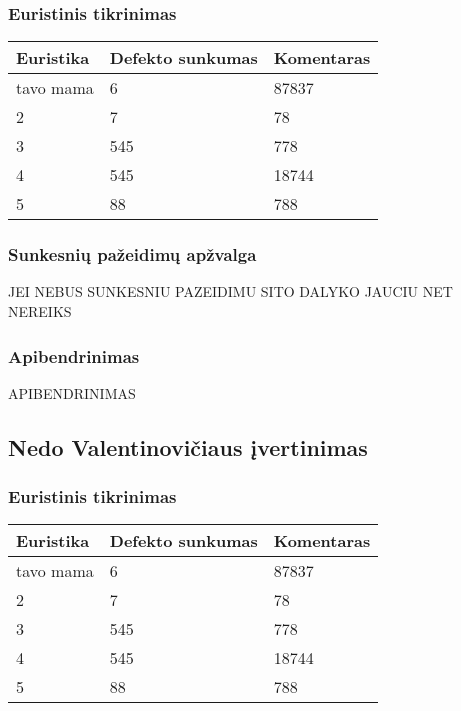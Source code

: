 \documentclass{VUMIFPSkursinis}
\begin{document}
\subsubsection{Euristinis tikrinimas}
\begin{center}
 \begin{tabular}{|| p{4cm} | p{4cm} | p{8cm} ||} 
 \hline
 Euristika & Defekto sunkumas & Komentaras \\
 \hline\hline
 tavo mama & 6 & 87837 \\ 
 \hline
 2 & 7 & 78 \\
 \hline
 3 & 545 & 778 \\
 \hline
 4 & 545 & 18744 \\
 \hline
 5 & 88 & 788 \\  %
 \hline                 %
\end{tabular}	
\end{center}

\subsubsection{Sunkesnių pažeidimų apžvalga}
JEI NEBUS SUNKESNIU PAZEIDIMU SITO DALYKO JAUCIU NET NEREIKS

\subsubsection{Apibendrinimas}
APIBENDRINIMAS

\subsection{Nedo Valentinovičiaus įvertinimas}
\subsubsection{Euristinis tikrinimas}
\begin{center}
 \begin{tabular}{|| p{4cm} | p{4cm} | p{8cm} ||} 
 \hline
 Euristika & Defekto sunkumas & Komentaras \\
 \hline\hline
 tavo mama & 6 & 87837 \\ 
 \hline
 2 & 7 & 78 \\
 \hline
 3 & 545 & 778 \\
 \hline
 4 & 545 & 18744 \\
 \hline
 5 & 88 & 788 \\  %
 \hline                 %
\end{tabular}	
\end{center}
\end{document}
